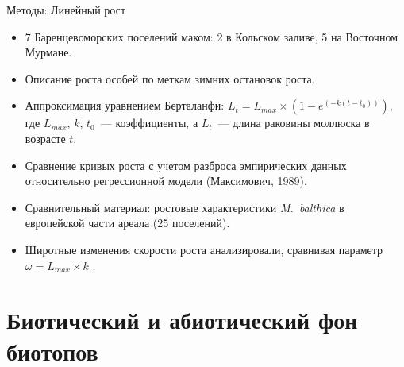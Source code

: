 \documentclass{beamer}
\begin{document}
\begin{frame}{Методы: Линейный рост}
	\begin{itemize}
		\item 7 Баренцевоморских поселений маком: 2 в Кольском заливе, 5 на Восточном Мурмане.
		\item Описание роста особей по меткам зимних остановок роста.
		\item Аппроксимация уравнением Берталанфи: $L_{t} = L_{max} \times (1 - e^{(-k(t - t_{0}))})$, где $L_{max}$, $k$, $t_{0}$~--- коэффициенты, а $L_{t}$~--- длина раковины моллюска в возрасте $t$.
		\item Сравнение кривых роста с учетом разброса эмпирических данных относительно регрессионной модели (Максимович, 1989).
		\item Сравнительный материал: ростовые характеристики {\it M.~balthica} в европейской части ареала (25 поселений).
		\item Широтные изменения скорости роста анализировали, сравнивая параметр $\omega = L_{max} \times k$ .
	\end{itemize}
\end{frame}


		\section[Биотопы]{Биотический и абиотический фон биотопов}
\end{document}
